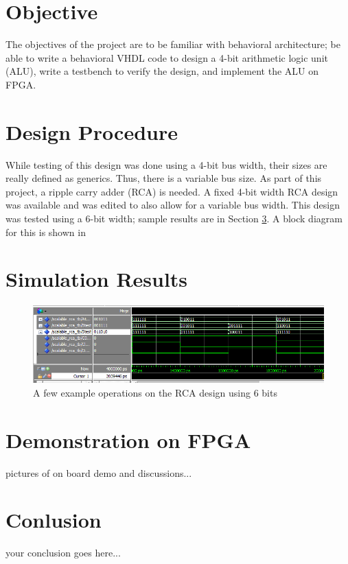 \documentclass[12pt]{article}
\begin{document}
\newpage

\section{Objective} \label{sec:obj}
The objectives of the project are to be familiar with behavioral architecture; be able
to write a behavioral VHDL code to design a 4-bit arithmetic logic unit (ALU), write
a testbench to verify the design, and implement the ALU on FPGA.

\section{Design Procedure} \label{sec:desproc}
While testing of this design was done using a 4-bit bus width, their sizes are really defined as generics.  Thus, there is a variable bus size.  As part of this project, a ripple carry adder (RCA) is needed.  A fixed 4-bit width RCA design was available and was edited to also allow for a variable bus width.  This design was tested using a 6-bit width; sample results are in Section \ref{simresults}.	A block diagram for this is shown in %


\section{Simulation Results} \label{simresults}
\begin{figure}[H]
\begin{center}
\includegraphics[scale=0.7]{rca_sim_results_example.png}
\caption{A few example operations on the RCA design using 6 bits}
\label{fig:simrca0}
\end{center}
\end{figure}

\section{Demonstration on FPGA} \label{demo}
pictures of on board demo and discussions...
 
\section{Conlusion} \label{cncl}
your conclusion goes here...
\end{document}
